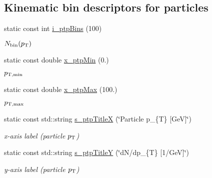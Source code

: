 \subsection*{Kinematic bin descriptors for particles}
\begin{CompactItemize}
\item 
\hypertarget{namespaceHistGroupCfg_6b14760e766e985a28569d0b5f1e1a53}{
static const int \hyperlink{namespaceHistGroupCfg_6b14760e766e985a28569d0b5f1e1a53}{i\_\-ptp\-Bins} (100)}
\label{namespaceHistGroupCfg_6b14760e766e985a28569d0b5f1e1a53}

\begin{CompactList}\small\item\em $N_{\rm bin}(p_{\rm T}) $ \item\end{CompactList}\item 
\hypertarget{namespaceHistGroupCfg_13d6b1910b2f4937d10c3aac16a73839}{
static const double \hyperlink{namespaceHistGroupCfg_13d6b1910b2f4937d10c3aac16a73839}{x\_\-ptp\-Min} (0.)}
\label{namespaceHistGroupCfg_13d6b1910b2f4937d10c3aac16a73839}

\begin{CompactList}\small\item\em $p_{\rm T,min}$ \item\end{CompactList}\item 
\hypertarget{namespaceHistGroupCfg_8b473b25fecf8655fcfaa3315b5c80bd}{
static const double \hyperlink{namespaceHistGroupCfg_8b473b25fecf8655fcfaa3315b5c80bd}{x\_\-ptp\-Max} (100.)}
\label{namespaceHistGroupCfg_8b473b25fecf8655fcfaa3315b5c80bd}

\begin{CompactList}\small\item\em $p_{\rm T,max}$ \item\end{CompactList}\item 
\hypertarget{namespaceHistGroupCfg_5c9c00aaec94307bfcf2074ed20bea10}{
static const std::string \hyperlink{namespaceHistGroupCfg_5c9c00aaec94307bfcf2074ed20bea10}{s\_\-ptp\-Title\-X} (\char`\"{}Particle p\_\-\{T\} \mbox{[}Ge\-V\mbox{]}\char`\"{})}
\label{namespaceHistGroupCfg_5c9c00aaec94307bfcf2074ed20bea10}

\begin{CompactList}\small\item\em x-axis label (particle $p_{\rm T}$) \item\end{CompactList}\item 
\hypertarget{namespaceHistGroupCfg_bc03f26ea883b4f308ee3b1de71017ab}{
static const std::string \hyperlink{namespaceHistGroupCfg_bc03f26ea883b4f308ee3b1de71017ab}{s\_\-ptp\-Title\-Y} (\char`\"{}d\-N/dp\_\-\{T\} \mbox{[}1/Ge\-V\mbox{]}\char`\"{})}
\label{namespaceHistGroupCfg_bc03f26ea883b4f308ee3b1de71017ab}

\begin{CompactList}\small\item\em y-axis label (particle $p_{\rm T}$) \item\end{CompactList}\end{CompactItemize}
